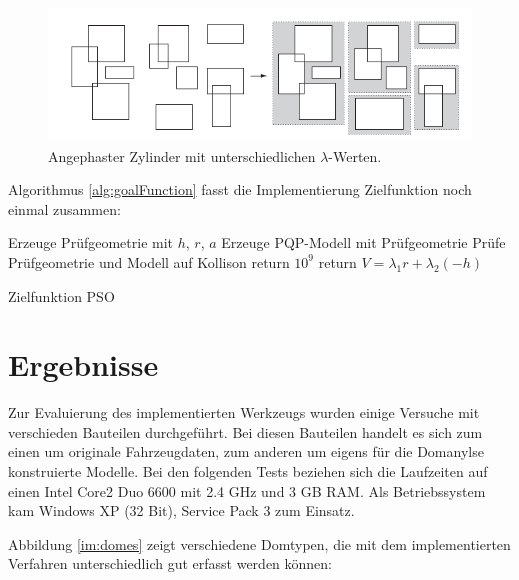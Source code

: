 \begin{figure}[ht]
\centerline{
	\includegraphics[width=0.7\columnwidth]{graphics/box.png}
}
\caption{Angephaster Zylinder mit unterschiedlichen $\lambda$-Werten.}
\label{im:messlehre}
\end{figure}

\vspace{1cm}

Algorithmus \ref{alg:goalFunction} fasst die Implementierung Zielfunktion  noch einmal zusammen:

\begin{algorithm}[H]
 \SetLine %
 Erzeuge Pr\"ufgeometrie mit ${h}$, ${r}$, ${a}$\;
 Erzeuge PQP-Modell mit Pr\"ufgeometrie\;
 Pr\"ufe  Pr\"ufgeometrie und Modell auf Kollison\;
 {
      return $10^9$\;
 }
 return ${V=\lambda_{1}{r} + \lambda_{2}({-h})}$
 \caption{Zielfunktion PSO}
 \label{alg:goalFunction}
\end{algorithm}


\section{Ergebnisse}
\label{resultsPSO}

Zur Evaluierung des implementierten Werkzeugs wurden einige Versuche mit verschieden Bauteilen durchgef\"uhrt.
Bei diesen Bauteilen handelt es sich zum einen um originale Fahrzeugdaten, zum anderen um eigens f\"ur die Domanylse konstruierte Modelle. Bei den folgenden Tests beziehen sich die Laufzeiten auf einen Intel Core2 Duo 6600 mit 2.4 GHz und 3 GB RAM. Als
Betriebssystem kam Windows XP (32 Bit), Service Pack 3 zum Einsatz.

Abbildung \ref{im:domes} zeigt verschiedene Domtypen, die mit dem implementierten Verfahren unterschiedlich gut erfasst werden k\"onnen:


